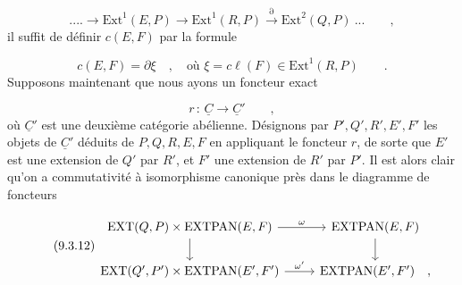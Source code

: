 \begin{equation*}
.... \longrightarrow \mathrm{Ext}^1(E,P) \longrightarrow \mathrm{Ext}^1(R,P) \stackrel{\partial}{\longrightarrow} \mathrm{Ext}^2(Q,P) \ ... \qquad ,
\end{equation*}
il suffit de définir $c(E,F)$ par la formule

\begin{equation}\tag{9.3.10}
c(E,F) = \partial \xi \quad , \quad \mbox{où } \xi = c\ell(F) \in \mathrm{Ext}^1(R,P) \qquad .
\end{equation}
Supposons maintenant que nous ayons un foncteur exact

\begin{equation}\tag{9.3.11}
r \,:\, \underline{C} \longrightarrow \underline{C}{}' \qquad ,
\end{equation}
où $\underline{C}{}'$ est une deuxième catégorie abélienne. Désignons par $P',Q',R',E',F'$ les objets de $\underline{C}{}'$ déduits de $P,Q,R,E,F$ en appliquant le foncteur $r$, de sorte que $E'$ est une extension de $Q'$ par $R'$, et $F'$ une extension de $R'$ par $P'$. Il est alors clair qu'on a commutativité à isomorphisme canonique près dans le diagramme de foncteurs

\begin{equation}\tag{9.3.12}
\begin{tikzcd}
\mathrm{EXT}(Q,P) \times \mathrm{EXTPAN}(E,F) \arrow[r, "\omega"] \arrow[d] & \mathrm{EXTPAN}(E,F) \arrow[d] \\
\mathrm{EXT}(Q',P') \times \mathrm{EXTPAN}(E',F') \arrow[r, "\omega'"] & \mathrm{EXTPAN}(E',F') \quad ,
\end{tikzcd}
\end{equation}


